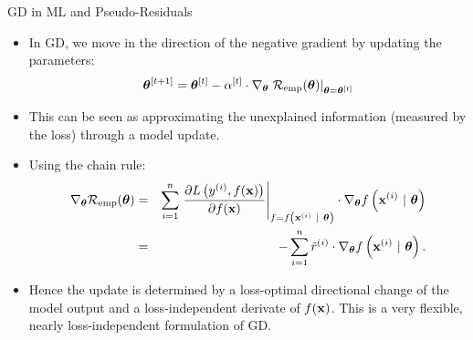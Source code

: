 \documentclass[11pt,compress,t,notes=noshow, xcolor=table]{beamer}
\begin{document}
\begin{vbframe}{GD in ML and Pseudo-Residuals}

\begin{itemize}
	\item In GD, we move in the direction of the negative gradient by updating the parameters: 
	$$
	 \bm{\theta}^{[t + 1]} = \bm{\theta}^{[t]} - \alpha^{[t]} \cdot \nabla_{\bm{\theta}} \left.\mathcal{R}_{\text{emp}}(\bm{\theta})\right|_{\bm{\theta} = \bm{\theta}^{[t]}}	
	$$
	\item This can be seen as approximating the unexplained information (measured by the loss) through a model update. 
	\item Using the chain rule:
	\begin{eqnarray*}
	\nabla_{\bm{\theta}} \mathcal{R}_{\text{emp}}(\bm{\theta}) &=&\sum\limits_{i=1}^n \left.\frac{\partial L\left(y^{(i)}, f(\mathbf{x})\right)}{\partial f(\mathbf{x})} \right|_{f = f\left(\mathbf{x}^{(i)} ~|~ \bm{\theta}\right)} 
	\cdot \nabla_{\bm{\theta}} f\left(\mathbf{x}^{(i)} ~|~ \bm{\theta}\right) \\ 
	&=& - \sum\limits_{i=1}^n \tilde r^{(i)} \cdot \nabla_{\bm{\theta}} f\left(\mathbf{x}^{(i)} ~|~ \bm{\theta}\right).
	\end{eqnarray*}
	\item Hence the update is determined by a loss-optimal directional change of the model output 
        and a loss-independent derivate of $f(\mathbf{x})$.
        This is a very flexible, nearly loss-independent formulation of GD.
\end{itemize}	

\end{vbframe}
\end{document}
